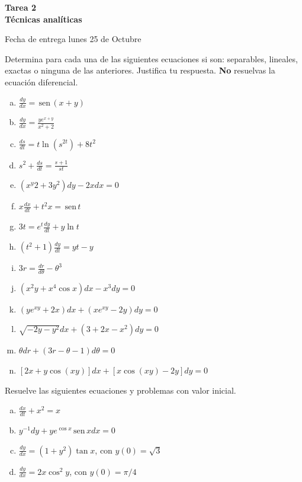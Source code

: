 \documentclass[12pt]{exam}
\renewcommand{\sin}{\,\text{sen}\,}
\begin{document}
\centering


\Large 
\textbf{\huge Tarea 2\\ \large Técnicas analíticas}

\small
Fecha de entrega lunes 25 de Octubre
\vskip10pt

\normalsize

\pointformat{\bfseries\boldmath(\thepoints)}
\vskip10pt

    
    \begin{questions}
     \question
     Determina para cada una de las siguientes ecuaciones si son: separables, lineales, exactas o ninguna de las anteriores. Justifica tu respuesta. \textbf{No} resuelvas la ecuación diferencial.
     \begin{enumerate}[a)]
         \item $\frac{dy}{dx}=\sin(x+y)$
         \item $\frac{dy}{dx}=\frac{ye^{x+y}}{x^2+2}$
         \item $\frac{ds}{dt}=t\ln(s^{2t})+8t^2$
         \item $s^2+\frac{ds}{dt}=\frac{s+1}{st}$
         \item $(x^y2+3y^2)dy-2xdx=0$
         \item $x\frac{dx}{dt}+t^2x=\sin t$
         \item $3t=e^t\frac{dy}{dt}+y\ln t$
         \item $(t^2+1)\frac{dy}{dt}=yt-y$
         \item $3r=\frac{dr}{d\theta}-\theta^3$
         \item $(x^2y+x^4\cos x)dx-x^3dy=0$
         \item $(ye^{xy}+2x)dx+(xe^{xy}-2y)dy=0$
         \item $\sqrt{-2y-y^2}dx+(3+2x-x^2)dy=0$
         \item $\theta dr+(3r-\theta-1)d\theta=0$
         \item $[2x+y\cos(xy)]dx+[x\cos(xy)-2y]dy=0$
     \end{enumerate}
    
     \question
     Resuelve las siguientes ecuaciones y problemas con valor inicial.
     \begin{enumerate}[a)]
     	\item $\frac{dx}{dt}+x^2=x$
        \item $y^{-1}dy+ye^{\cos x}\sin xdx=0$
        \item $\frac{dy}{dx}=(1+y^2)\tan x$, con $y(0)=\sqrt{3}$
        \item $\frac{dy}{dx}=2x\cos^2y$, con $y(0)=\pi/4$
     \end{enumerate}


\end{questions}
\end{document}
